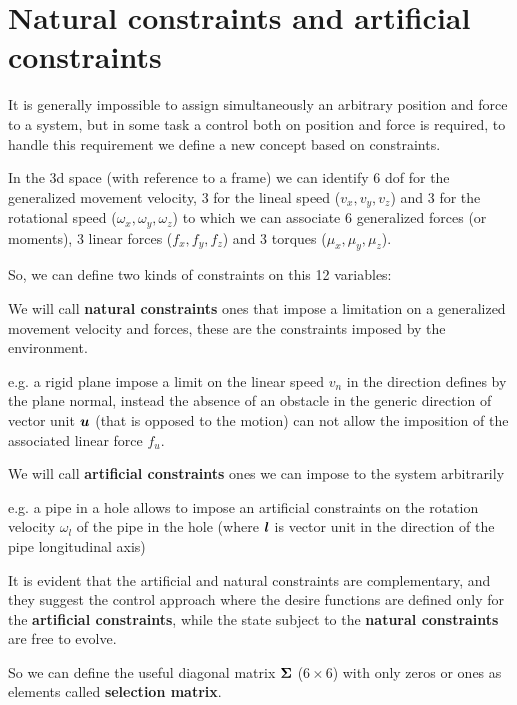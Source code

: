 \section{Natural constraints and artificial constraints}

It is generally impossible to assign simultaneously an arbitrary position and force to a system, but in some task a control both on position and force is required, to handle this requirement we define a new concept based on constraints.

In the 3d space (with reference to a frame) we can identify 6 dof for the generalized movement velocity, 3 for the lineal speed ($v_x,v_y,v_z$) and 3 for the rotational speed ($\omega_x,\omega_y,\omega_z$) to which we can associate 6 generalized forces (or moments), 3 linear forces ($f_x,f_y,f_z$) and 3 torques ($\mu_x,\mu_y,\mu_z$).

So, we can define two kinds of constraints on this 12 variables:

We will call \textbf{natural constraints} ones that impose a limitation on a generalized movement velocity and forces, these are the constraints imposed by the environment.
\\ \begin{em}e.g. a rigid plane impose a limit on the linear speed $v_n$ in the direction defines by the plane normal, instead the absence of an obstacle in the generic direction of vector unit $\boldsymbol{u}$ (that is opposed to the motion) can not allow the imposition of the associated linear force $f_u$.\end{em}

We will call \textbf{artificial constraints} ones we can impose to the system arbitrarily
\\ \begin{em}e.g. a pipe in a hole allows to impose an artificial constraints on the rotation velocity $\omega_l$ of the pipe in the hole (where $\boldsymbol{l}$ is vector unit in the direction of the pipe longitudinal axis)\end{em}

It is evident that the artificial and natural constraints are complementary, and they suggest the control approach where the desire functions are defined only for the \textbf{artificial constraints}, while the state subject to the \textbf{natural constraints} are free to evolve.

So we can define the useful diagonal matrix $\boldsymbol{\Sigma}$ ($6\times6$) with only zeros or ones as elements called \textbf{selection matrix}.

